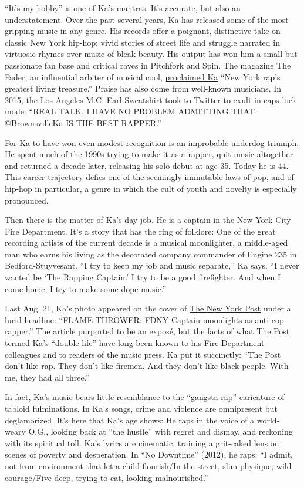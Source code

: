 ``It's my hobby'' is one of Ka's mantras. It's accurate, but also an
understatement. Over the past several years, Ka has released some of the
most gripping music in any genre. His records offer a poignant,
distinctive take on classic New York hip-hop: vivid stories of street
life and struggle narrated in virtuosic rhymes over music of bleak
beauty. His output has won him a small but passionate fan base and
critical raves in Pitchfork and Spin. The magazine The Fader, an
influential arbiter of musical cool,
\href{http://www.thefader.com/2016/10/04/ka-interview-new-york-post}{proclaimed
Ka} ``New York rap's greatest living treasure.'' Praise has also come
from well-known musicians. In 2015, the Los Angeles M.C. Earl Sweatshirt
took to Twitter to exult in caps-lock mode: ``REAL TALK, I HAVE NO
PROBLEM ADMITTING THAT @BrownsvilleKa IS THE BEST RAPPER.''

For Ka to have won even modest recognition is an improbable underdog
triumph. He spent much of the 1990s trying to make it as a rapper, quit
music altogether and returned a decade later, releasing his solo debut
at age 35. Today he is 44. This career trajectory defies one of the
seemingly immutable laws of pop, and of hip-hop in particular, a genre
in which the cult of youth and novelty is especially pronounced.

Then there is the matter of Ka's day job. He is a captain in the New
York City Fire Department. It's a story that has the ring of folklore:
One of the great recording artists of the current decade is a musical
moonlighter, a middle-aged man who earns his living as the decorated
company commander of Engine 235 in Bedford-Stuyvesant. ``I try to keep
my job and music separate,'' Ka says. ``I never wanted be `The Rapping
Captain.' I try to be a good firefighter. And when I come home, I try to
make some dope music.''

Last Aug. 21, Ka's photo appeared on the cover of
\href{http://nypost.com/2016/08/21/fdny-veteran-bad-mouths-cops-in-double-life-as-rapper/}{The
New York Post} under a lurid headline: ``FLAME THROWER: FDNY Captain
moonlights as anti-cop rapper.'' The article purported to be an exposé,
but the facts of what The Post termed Ka's ``double life'' have long
been known to his Fire Department colleagues and to readers of the music
press. Ka put it succinctly: ``The Post don't like rap. They don't like
firemen. And they don't like black people. With me, they had all
three.''

In fact, Ka's music bears little resemblance to the ``gangsta rap''
caricature of tabloid fulminations. In Ka's songs, crime and violence
are omnipresent but deglamorized. It's here that Ka's age shows: He raps
in the voice of a world-weary O.G., looking back at ``the hustle'' with
regret and dismay, and reckoning with its spiritual toll. Ka's lyrics
are cinematic, training a grit-caked lens on scenes of poverty and
desperation. In ``No Downtime'' (2012), he raps: ``I admit, not from
environment that let a child flourish/In the street, slim physique, wild
courage/Five deep, trying to eat, looking malnourished.''

